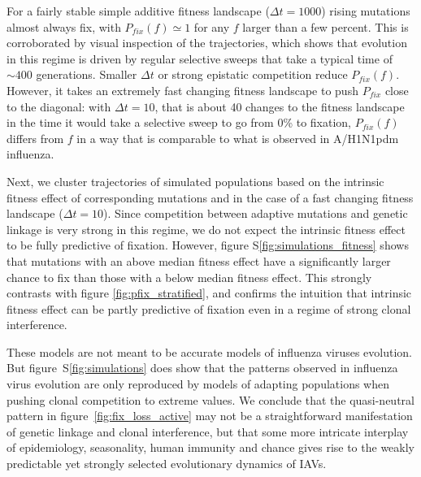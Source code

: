 \documentclass[reprint,amsmath,amssymb,superscriptaddress,showpacs,rmp]{revtex4-1}
\newcommand{\sref}[1]{S\ref{#1}}
\begin{document}
For a fairly stable simple additive fitness landscape ($\Delta t=1000$) rising mutations almost always fix, with $P_{fix}(f)\simeq 1$ for any $f$ larger than a few percent.
This is corroborated by visual inspection of the trajectories, which shows that evolution in this regime is driven by regular selective sweeps that take a typical time of $\sim 400$ generations.
Smaller $\Delta t$ or strong epistatic competition reduce $P_{fix}(f)$.
However, it takes an extremely fast changing fitness landscape to push $P_{fix}$ close to the diagonal: with $\Delta t=10$, that is about 40 changes to the fitness landscape in the time it would take a selective sweep to go from 0\% to fixation, $P_{fix}(f)$ differs from $f$ in a way that is comparable to what is observed in A/H1N1pdm influenza.

Next, we cluster trajectories of simulated populations based on the intrinsic fitness effect of corresponding mutations and in the case of a fast changing fitness landscape ($\Delta t=10$). 
Since competition between adaptive mutations and genetic linkage is very strong in this regime, we do not expect the intrinsic fitness effect to be fully predictive of fixation. 
However, figure \sref{fig:simulations_fitness} shows that mutations with an above median fitness effect have a significantly larger chance to fix than those with a below median fitness effect. 
This strongly contrasts with figure \ref{fig:pfix_stratified}, and confirms the intuition that intrinsic fitness effect can be partly predictive of fixation even in a regime of strong clonal interference.


These models are not meant to be accurate models of influenza viruses evolution.
But figure~\sref{fig:simulations} does show that the patterns observed in influenza virus evolution are only reproduced by models of adapting populations when pushing clonal competition to extreme values.
We conclude that the quasi-neutral pattern in figure~\ref{fig:fix_loss_active} may not be a straightforward manifestation of genetic linkage and clonal interference, but that some more intricate interplay of epidemiology, seasonality, human immunity and chance gives rise to the weakly predictable yet strongly selected evolutionary dynamics of IAVs.
\end{document}
